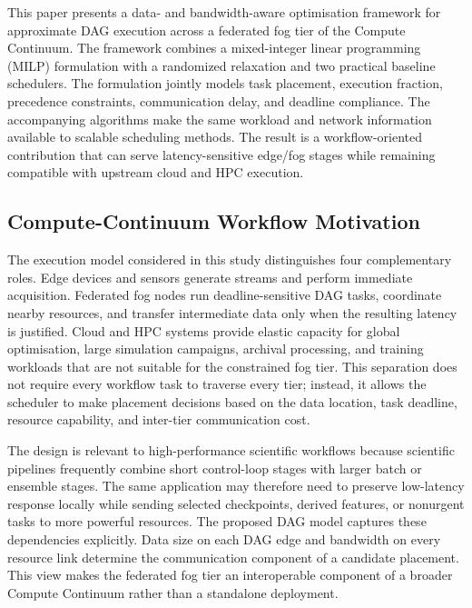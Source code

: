 This paper presents a data- and bandwidth-aware optimisation framework for approximate DAG execution across a federated fog tier of the Compute Continuum. The framework combines a mixed-integer linear programming (MILP) formulation with a randomized relaxation and two practical baseline schedulers. The formulation jointly models task placement, execution fraction, precedence constraints, communication delay, and deadline compliance. The accompanying algorithms make the same workload and network information available to scalable scheduling methods. The result is a workflow-oriented contribution that can serve latency-sensitive edge/fog stages while remaining compatible with upstream cloud and HPC execution.

\subsection{Compute-Continuum Workflow Motivation}

The execution model considered in this study distinguishes four complementary roles. Edge devices and sensors generate streams and perform immediate acquisition. Federated fog nodes run deadline-sensitive DAG tasks, coordinate nearby resources, and transfer intermediate data only when the resulting latency is justified. Cloud and HPC systems provide elastic capacity for global optimisation, large simulation campaigns, archival processing, and training workloads that are not suitable for the constrained fog tier. This separation does not require every workflow task to traverse every tier; instead, it allows the scheduler to make placement decisions based on the data location, task deadline, resource capability, and inter-tier communication cost.

The design is relevant to high-performance scientific workflows because scientific pipelines frequently combine short control-loop stages with larger batch or ensemble stages. The same application may therefore need to preserve low-latency response locally while sending selected checkpoints, derived features, or nonurgent tasks to more powerful resources. The proposed DAG model captures these dependencies explicitly. Data size on each DAG edge and bandwidth on every resource link determine the communication component of a candidate placement. This view makes the federated fog tier an interoperable component of a broader Compute Continuum rather than a standalone deployment.

